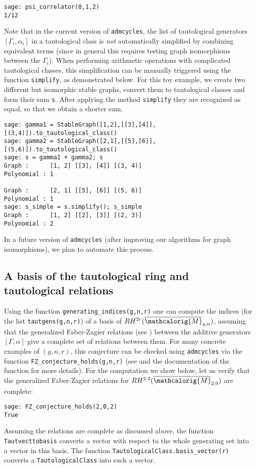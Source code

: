 \documentclass[11pt]{article}
\newcommand{\M}{\ensuremath{\overline{\mathcalorig{M}}}}
\begin{document}
\begin{lstlisting}
sage: psi_correlator(0,1,2)
1/12
\end{lstlisting}
Note that in the current version of \texttt{admcycles}, the list of tautological generators $[\Gamma_i,\alpha_i]$ in a tautological class is \emph{not} automatically simplified by combining equivalent terms (since in general this requires testing graph isomorphisms between the $\Gamma_i$). When performing arithmetic operations with complicated tautological classes, this simplification can be manually triggered using the function \texttt{simplify}, as demonstrated below. For this toy example, we create two different but isomorphic stable graphs, convert them to tautological classes and form their sum \texttt{s}. After applying the method \texttt{simplify} they are recognized as equal, so that we obtain a shorter sum.
\begin{lstlisting}
sage: gamma1 = StableGraph([1,2],[[3],[4]],[(3,4)]).to_tautological_class()
sage: gamma2 = StableGraph([2,1],[[5],[6]],[(5,6)]).to_tautological_class()
sage: s = gamma1 + gamma2; s
Graph :      [1, 2] [[3], [4]] [(3, 4)]
Polynomial : 1

Graph :      [2, 1] [[5], [6]] [(5, 6)]
Polynomial : 1
sage: s_simple = s.simplify(); s_simple
Graph :      [1, 2] [[2], [3]] [(2, 3)]
Polynomial : 2
\end{lstlisting}
In a future version of \texttt{admcycles} (after improving our algorithms for graph isomorphisms), we plan to automate this process.


\subsection{A basis of the tautological ring and tautological relations} \label{Sect:basis}
Using the function \verb|generating_indices(g,n,r)| one can compute the indices (for the list \texttt{tautgens(g,n,r)}) of a basis of $RH^{2r}(\M_{g,n})$, assuming that the generalized Faber-Zagier relations (see \cite{pixtonrels,pandhapixton,jandarels}) between the additive generators $[\Gamma, \alpha]$ give a complete set of relations between them. 
For many concrete examples of $(g,n,r)$, this conjecture can be checked using \texttt{admcycles} via the function \verb|FZ_conjecture_holds(g,n,r)| (see \cite[Appendix B]{lambdaformula} and the documentation of the function for more details). For the computation we show below, let us verify that the generalized Faber-Zagier relations for $RH^{2\cdot 2}(\M_{2,0})$ are complete:
\begin{lstlisting}
sage: FZ_conjecture_holds(2,0,2)
True
\end{lstlisting}
Assuming the relations are complete as discussed above, the function \verb|Tautvecttobasis| converts a vector with respect to the whole generating set into a vector in this basis. The function \verb|TautologicalClass.basis_vector(r)| converts a \verb|TautologicalClass| into such a vector.
\end{document}
